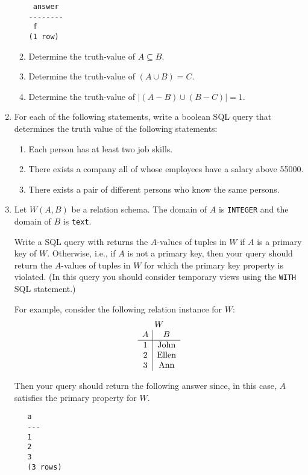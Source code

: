 \begin{enumerate}
\begin{enumerate}
\begin{verbatim}
 answer 
--------
 f
(1 row)
\end{verbatim}

 \item  Determine the truth-value of $A\subseteq B$.
 \item  Determine the truth-value of $(A\cup B) = C$.
 \item  Determine the truth-value of $|(A-B) \cup (B- C)| = 1$.
\end{enumerate}


\item For each of the following statements, write a boolean SQL query that determines the
truth value of the following statements:
\begin{enumerate}
\item  Each person has at least two job skills.
\item  There exists a company all of whose employees have a salary above 55000.
\item  There exists a pair of different persons who know the same persons.
\end{enumerate}


\item  Let $W(A,B)$ be a relation schema.   The domain of $A$ is {\tt INTEGER} and the domain of $B$ is
  {\tt text}.

  Write a SQL query with returns the $A$-values of tuples in $W$ if
  $A$ is a primary key of $W$.  Otherwise, i.e., if $A$ is not a
  primary key, then your query should return the $A$-values of tuples
  in $W$ for which the primary key property is violated.  (In this
  query you should consider temporary views using the {\tt WITH} SQL statement.)

  For example, consider the following relation instance for $W$:
  \[
  \begin{array}{c}
    W \\
    \begin{array}{c|c}
      A & B \\ \hline
      1 & \mbox{\rm John} \\
      2 & \mbox{\rm Ellen} \\
      3 & \mbox{\rm Ann}
    \end{array}
  \end{array}
  \]

  Then your query should return the following answer since, in this
  case, $A$ satisfies the primary property for $W$.

\begin{center}
  \begin{verbatim}
   a 
   ---
   1
   2
   3
   (3 rows)
 \end{verbatim}
 \end{center}


\end{enumerate}
